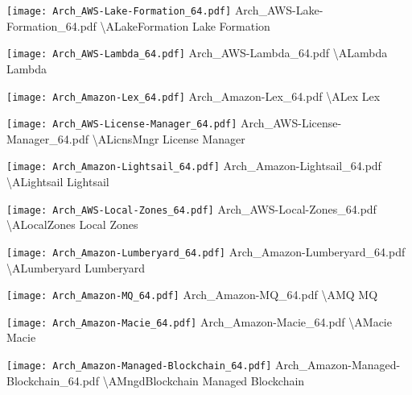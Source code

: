  {\texttt{[image: Arch\_AWS-Lake-Formation\_64.pdf]}} {Arch\_AWS-Lake-Formation\_64.pdf} {{\textbackslash}ALakeFormation} {Lake Formation}

 {\texttt{[image: Arch\_AWS-Lambda\_64.pdf]}} {Arch\_AWS-Lambda\_64.pdf} {{\textbackslash}ALambda} {Lambda}

 {\texttt{[image: Arch\_Amazon-Lex\_64.pdf]}} {Arch\_Amazon-Lex\_64.pdf} {{\textbackslash}ALex} {Lex}

 {\texttt{[image: Arch\_AWS-License-Manager\_64.pdf]}} {Arch\_AWS-License-Manager\_64.pdf} {{\textbackslash}ALicnsMngr} {License Manager}

 {\texttt{[image: Arch\_Amazon-Lightsail\_64.pdf]}} {Arch\_Amazon-Lightsail\_64.pdf} {{\textbackslash}ALightsail} {Lightsail}

 {\texttt{[image: Arch\_AWS-Local-Zones\_64.pdf]}} {Arch\_AWS-Local-Zones\_64.pdf} {{\textbackslash}ALocalZones} {Local Zones}

 {\texttt{[image: Arch\_Amazon-Lumberyard\_64.pdf]}} {Arch\_Amazon-Lumberyard\_64.pdf} {{\textbackslash}ALumberyard} {Lumberyard}

 {\texttt{[image: Arch\_Amazon-MQ\_64.pdf]}} {Arch\_Amazon-MQ\_64.pdf} {{\textbackslash}AMQ} {MQ}

 {\texttt{[image: Arch\_Amazon-Macie\_64.pdf]}} {Arch\_Amazon-Macie\_64.pdf} {{\textbackslash}AMacie} {Macie}

 {\texttt{[image: Arch\_Amazon-Managed-Blockchain\_64.pdf]}} {Arch\_Amazon-Managed-Blockchain\_64.pdf} {{\textbackslash}AMngdBlockchain} {Managed Blockchain}

